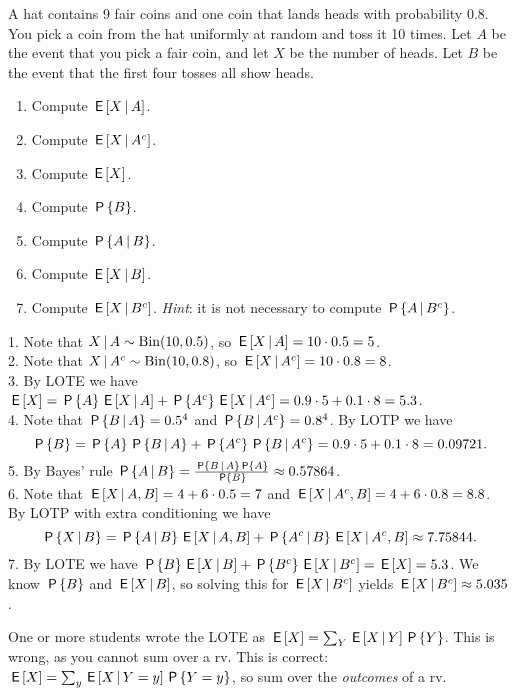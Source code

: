 \documentclass[assignments]{subfiles}
\begin{document}
\begin{exercise}
A hat contains 9 fair coins and one coin that lands heads with probability 0.8. You pick a coin from the hat uniformly at random and toss it 10 times. Let $A$ be the event that you pick a fair coin, and let $X$ be the number of heads. Let $B$ be the event that the first four tosses all show heads.

\begin{enumerate}
\item Compute $\E{X \given A}$.
\item Compute $\E{X \given A^c}$.
\item Compute $\E{X}$.
\item Compute $\P{B}$.
\item Compute $\P{A \given B}$.
\item Compute $\E{X \given B}$.
\item Compute $\E{X \given B^c}$. \textit{Hint}: it is not necessary to compute $\P{A \given B^c}$.
\end{enumerate}

\begin{solution}
1. Note that $X \, |\, A \sim \Bin{10, 0.5}$, so $\E{X \given A} = 10 \cdot 0.5 = 5$. \\
2. Note that $X \, |\,  A^c \sim \Bin{10, 0.8}$, so $\E{X \given A^c} = 10 \cdot 0.8 = 8$. \\
3. By LOTE we have $\E{X} = \P{A}\E{X \given A} +\P{A^c} \E{X \given A^c}  = 0.9 \cdot 5 + 0.1\cdot 8 = 5.3$. \\
4. Note that  $\P{B \given A}  = 0.5^4$ and $\P{B \given A^c}  = 0.8^4$.
By LOTP we have
\begin{equation*}
\P{B} = \P{A}\P{B \given A} +\P{A^c} \P{B \given A^c}  = 0.9 \cdot 5 + 0.1\cdot 8 = 0.09721.
\end{equation*}
5. By Bayes' rule $\P{A \given B} = \frac{\P{B \given A}\P{A}}{\P{B}} \approx 0.57864$. \\
6. Note that $\E{X \given A, B} = 4 + 6 \cdot 0.5 = 7$ and $\E{X \given A^c, B} = 4 + 6 \cdot 0.8 = 8.8$. By LOTP with extra conditioning we have
\begin{equation*}
\P{X \given B} = \P{A \given B}\E{X \given A, B} + \P{A^c \given B}\E{X \given A^c, B} \approx 7.75844.
\end{equation*}
7. By LOTE we have $\P{B}\E{X \given B} +\P{B^c} \E{X \given B^c}  = \E{X} = 5.3$. We know $\P{B}$ and $\E{X \given B}$, so solving this for $\E{X \given B^c}$ yields $\E{X \given B^c} \approx 5.035$.

One or more students wrote the LOTE as $\E X = \sum_{Y} \E{X\given Y} \P{Y}$. This is wrong, as you cannot sum over a rv. This is correct: $\E{X} = \sum_{y} \E{X\given Y=y} \P{Y=y}$, so sum over the \emph{outcomes} of a rv.

\end{solution}
\end{exercise}
\end{document}
